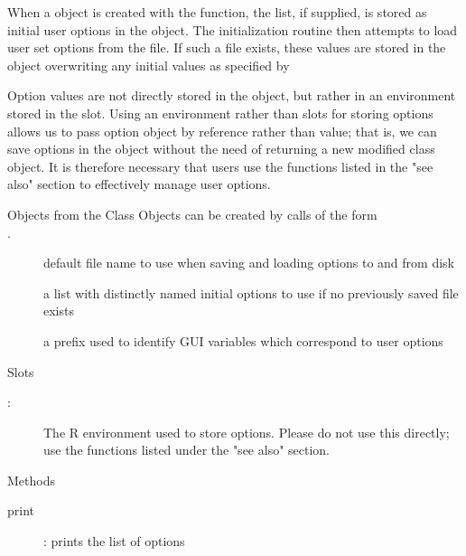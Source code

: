\documentclass[letterpaper]{book}
\begin{document}
%
\begin{Details}\relax
When a  object is created with the  function, the  list, if supplied, is stored
as initial user options in the object. The initialization routine then attempts to load user set options from the  file. If such a file exists,
these values are stored in the  object overwriting any initial values as specified by 

Option values are not directly stored in the object, but rather in an environment stored in the  slot.
Using an environment rather than slots for storing options allows us to pass option object by reference rather than value; that is,
we can save options in the object without the need of returning a new modified class object. It is therefore necessary that users
use the functions listed in the "see also" section to effectively manage user options.
\end{Details}
%
\begin{Section}{Objects from the Class}
Objects can be created by calls of the form \\{}
.
\begin{description}

\item[]  default file name to use when saving and loading options to and from disk 
\item[]  a list with distinctly named initial options to use if no previously saved file exists 
\item[]  a prefix used to identify GUI variables which correspond to user options 

\end{description}

\end{Section}
%
\begin{Section}{Slots}
\begin{description}

\item[:] The R environment used to store options. Please do not use this directly; use the functions listed under the "see also" section. 

\end{description}

\end{Section}
%
\begin{Section}{Methods}
\begin{description}

\item[print] : prints the list of options 

\end{description}

\end{Section}
\end{document}
